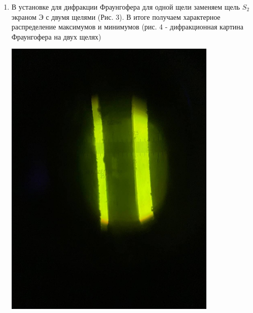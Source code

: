 \documentclass[a4paper]{article}
\begin{document}
\begin{enumerate}
     \item В установке для дифракции Фраунгофера для одной щели заменяем щель $S_2$ экраном Э с двумя щелями (Рис. 3). В итоге получаем характерное распределение максимумов и минимумов (рис. 4 - дифракционная картина Фраунгофера на двух щелях)

\begin{minipage}{0.5\textwidth}
        \centering
        \includegraphics[width=0.8\textwidth]{slit.jpg}
        \label{fig:slit}
\end{minipage}
\begin{minipage}{0.5\textwidth}
        \centering

\end{minipage}
\end{enumerate}
\end{document}
